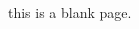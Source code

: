 \documentclass[a4paper]{article}
\begin{document}
\begin{CJK*}{UTF8}{gbsn}

\begin{onecolumn}

\begin{figure}
	\\
\end{figure}

\linespread{4}{
	\centering{
		\fontsize{30pt}{\baselineskip}\selectfont {
		
		
			ACM 模板 
			
		
		}
	}
}

\linespread{2}{
	\centering{
		\fontsize{10pt}{\baselineskip}\selectfont {
		
%

make by tiankonguse(http://tiankonguse.com/)\\powered by vici

%

		}
	}
}

\end{onecolumn}

\clearpage

this is a blank page.

\clearpage

\begin{multicols}{3}



\end{multicols}
\end{CJK*}
\end{document}
